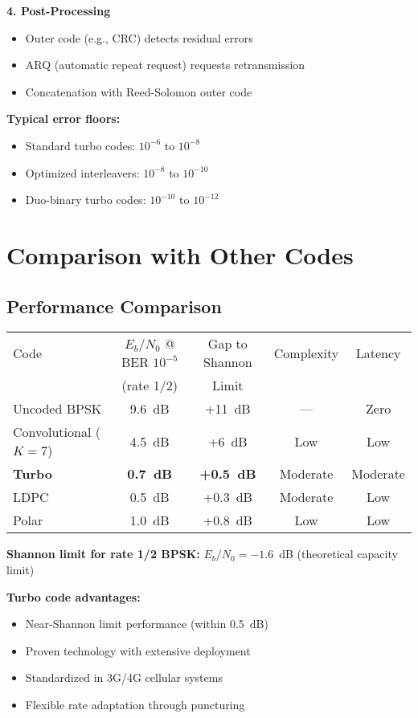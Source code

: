 \textbf{4. Post-Processing}
\begin{itemize}
\item Outer code (e.g., CRC) detects residual errors
\item ARQ (automatic repeat request) requests retransmission
\item Concatenation with Reed-Solomon outer code
\end{itemize}

\textbf{Typical error floors:}
\begin{itemize}
\item Standard turbo codes: $10^{-6}$ to $10^{-8}$
\item Optimized interleavers: $10^{-8}$ to $10^{-10}$
\item Duo-binary turbo codes: $10^{-10}$ to $10^{-12}$
\end{itemize}

\section{Comparison with Other Codes}

\subsection{Performance Comparison}

\begin{center}
\begin{tabular}{@{}lcccc@{}}
\toprule
Code & $E_b/N_0$ @ BER $10^{-5}$ & Gap to Shannon & Complexity & Latency \\
 & (rate 1/2) & Limit & & \\
\midrule
Uncoded BPSK & 9.6~dB & +11~dB & --- & Zero \\
Convolutional ($K=7$) & 4.5~dB & +6~dB & Low & Low \\
\textbf{Turbo} & \textbf{0.7~dB} & \textbf{+0.5~dB} & Moderate & Moderate \\
LDPC & 0.5~dB & +0.3~dB & Moderate & Low \\
Polar & 1.0~dB & +0.8~dB & Low & Low \\
\bottomrule
\end{tabular}
\end{center}

\textbf{Shannon limit for rate 1/2 BPSK:} $E_b/N_0 = -1.6$~dB (theoretical capacity limit)

\textbf{Turbo code advantages:}
\begin{itemize}
\item Near-Shannon limit performance (within 0.5~dB)
\item Proven technology with extensive deployment
\item Standardized in 3G/4G cellular systems
\item Flexible rate adaptation through puncturing
\end{itemize}

